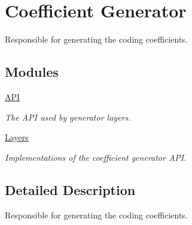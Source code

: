 \hypertarget{group__coefficient__generator}{\section{Coefficient Generator}
\label{group__coefficient__generator}
}


Responsible for generating the coding coefficients.  


\subsection*{Modules}
\begin{DoxyCompactItemize}
\item 
\hyperlink{group__coefficient__generator__api}{A\-P\-I}
\begin{DoxyCompactList}\small\item\em The A\-P\-I used by generator layers. \end{DoxyCompactList}\item 
\hyperlink{group__coefficient__generator__layers}{Layers}
\begin{DoxyCompactList}\small\item\em Implementations of the coefficient generator A\-P\-I. \end{DoxyCompactList}\end{DoxyCompactItemize}


\subsection{Detailed Description}
Responsible for generating the coding coefficients. 